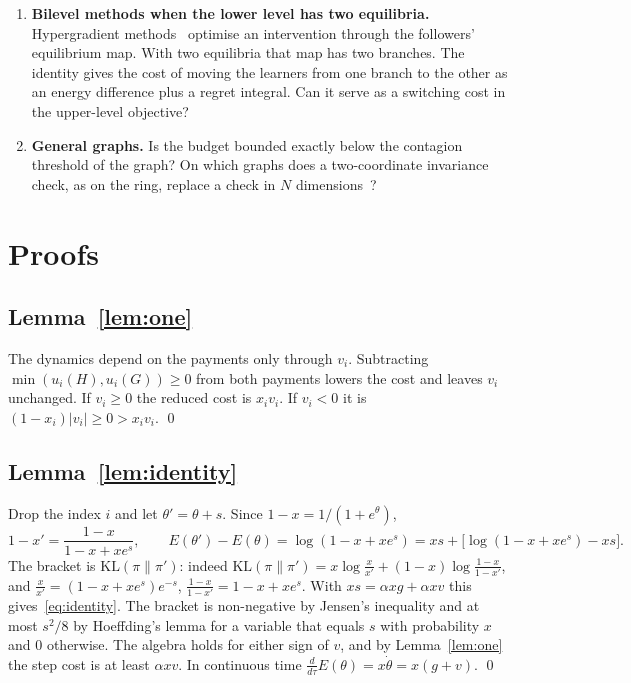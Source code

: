 \documentclass[11pt,a4paper]{article}
\theoremstyle{definition}
\theoremstyle{plain}
\newcommand{\KL}{\mathrm{KL}}
\begin{document}
\begin{enumerate}
\item \textbf{Bilevel methods when the lower level has two equilibria.} Hypergradient methods~\cite{grontas2024} optimise an intervention through the followers' equilibrium map. With two equilibria that map has two branches. The identity gives the cost of moving the learners from one branch to the other as an energy difference plus a regret integral. Can it serve as a switching cost in the upper-level objective?
\item \textbf{General graphs.} Is the budget bounded exactly below the contagion threshold of the graph? On which graphs does a two-coordinate invariance check, as on the ring, replace a check in $N$ dimensions~\cite{czechowski2023}?
\end{enumerate}

\appendix
\section{Proofs}\label{app:proofs}

\subsection{Lemma~\ref{lem:one}}
The dynamics depend on the payments only through $v_i$. Subtracting $\min(u_i(H),u_i(G))\ge0$ from both payments lowers the cost and leaves $v_i$ unchanged. If $v_i\ge0$ the reduced cost is $x_iv_i$. If $v_i<0$ it is $(1-x_i)|v_i|\ge0>x_iv_i$. \qed

\subsection{Lemma~\ref{lem:identity}}
Drop the index $i$ and let $\theta'=\theta+s$. Since $1-x=1/(1+e^\theta)$,
\[
1-x'=\frac{1-x}{1-x+xe^{s}},\qquad
E(\theta')-E(\theta)=\log(1-x+xe^{s})=xs+\bigl[\log(1-x+xe^{s})-xs\bigr].
\]
The bracket is $\KL(\pi\|\pi')$: indeed $\KL(\pi\|\pi')=x\log\frac{x}{x'}+(1-x)\log\frac{1-x}{1-x'}$, and $\frac{x}{x'}=(1-x+xe^{s})e^{-s}$, $\frac{1-x}{1-x'}=1-x+xe^{s}$. With $xs=\alpha xg+\alpha xv$ this gives~\eqref{eq:identity}. The bracket is non-negative by Jensen's inequality and at most $s^2/8$ by Hoeffding's lemma for a variable that equals $s$ with probability $x$ and $0$ otherwise. The algebra holds for either sign of $v$, and by Lemma~\ref{lem:one} the step cost is at least $\alpha xv$. In continuous time $\frac{d}{d\tau}E(\theta)=x\dot\theta=x(g+v)$. \qed
\end{document}
